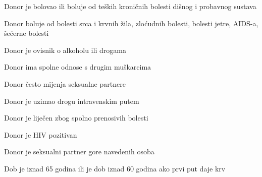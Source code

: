 \begin{packed_item}
\begin{packed_item}
\begin{packed_enum}
		\end{packed_enum}
		
		\item[6.a] {\item[]\begin{packed_item}
		\item[•]Donor je bolovao ili boluje od teških kroničnih bolesti dišnog i probavnog sustava
		\item[•]Donor boluje od bolesti srca i krvnih žila, zloćudnih bolesti, bolesti jetre, AIDS-a, šećerne bolesti 
		\item[•]Donor je ovisnik o alkoholu ili drogama 
		\item[•]Donor ima spolne odnose s drugim muškarcima 
		\item[•]Donor često mijenja seksualne partnere
		\item[•]Donor je uzimao drogu intravenskim putem
		\item[•]Donor je liječen zbog spolno prenosivih bolesti 
		\item[•]Donor je HIV pozitivan
		\item[•]Donor je seksualni partner gore navedenih osoba
		\item[•]Dob je iznad 65 godina ili je dob iznad 60 godina ako prvi put daje krv\end{packed_item}}
		\item[] \begin{packed_enum}
			

\end{packed_enum}
\end{packed_item}
\end{packed_item}
